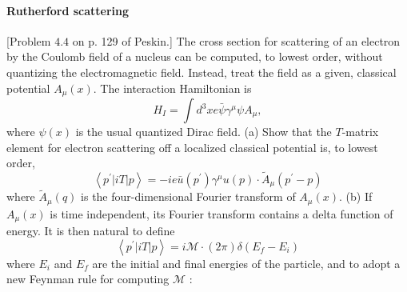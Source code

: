 \documentclass[hyperref, a4paper]{article}
\begin{document}
\paragraph{}

\paragraph{Rutherford scattering} [Problem $4.4$ on p. 129 of Peskin.] The cross section for scattering of an electron by the Coulomb field of a nucleus can be computed, to lowest order, without quantizing the electromagnetic field. Instead, treat the field as a given, classical potential $A_{\mu}(x)$. The interaction Hamiltonian is
\begin{equation}
    H_{I}=\int d^{3} x e \bar{\psi} \gamma^{\mu} \psi A_{\mu},
    \label{eq:interaction-ham-2}
\end{equation}
where $\psi(x)$ is the usual quantized Dirac field.
(a) Show that the $T$-matrix element for electron scattering off a localized classical potential is, to lowest order,
\[
\left\langle p^{\prime}|i T| p\right\rangle=-i e \bar{u}\left(p^{\prime}\right) \gamma^{\mu} u(p) \cdot \tilde{A}_{\mu}\left(p^{\prime}-p\right)
\]
where $\widetilde{A}_{\mu}(q)$ is the four-dimensional Fourier transform of $A_{\mu}(x)$.
(b) If $A_{\mu}(x)$ is time independent, its Fourier transform contains a delta function of energy. It is then natural to define
\[
\left\langle p^{\prime}|i T| p\right\rangle=i \mathcal{M} \cdot(2 \pi) \delta\left(E_{f}-E_{i}\right)
\]
where $E_{i}$ and $E_{f}$ are the initial and final energies of the particle, and to adopt a new Feynman rule for computing $\mathcal{M}$ :
\end{document}
